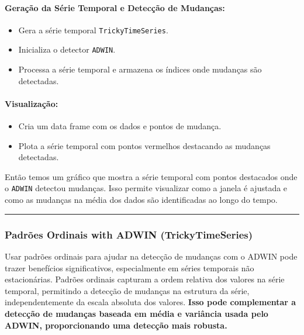 \documentclass[
]{article}
\providecommand{\tightlist}{%
  \setlength{\itemsep}{0pt}\setlength{\parskip}{0pt}}
\begin{document}
\hypertarget{gerauxe7uxe3o-da-suxe9rie-temporal-e-detecuxe7uxe3o-de-mudanuxe7as}{%
\paragraph{Geração da Série Temporal e Detecção de
Mudanças:}\label{gerauxe7uxe3o-da-suxe9rie-temporal-e-detecuxe7uxe3o-de-mudanuxe7as}}

\begin{itemize}
\tightlist
\item
  Gera a série temporal \texttt{TrickyTimeSeries}.
\item
  Inicializa o detector \texttt{ADWIN}.
\item
  Processa a série temporal e armazena os índices onde mudanças são
  detectadas.
\end{itemize}

\hypertarget{visualizauxe7uxe3o}{%
\paragraph{Visualização:}\label{visualizauxe7uxe3o}}

\begin{itemize}
\tightlist
\item
  Cria um data frame com os dados e pontos de mudança.
\item
  Plota a série temporal com pontos vermelhos destacando as mudanças
  detectadas.
\end{itemize}

Então temos um gráfico que mostra a série temporal com pontos destacados
onde o \texttt{ADWIN} detectou mudanças. Isso permite visualizar como a
janela é ajustada e como as mudanças na média dos dados são
identificadas ao longo do tempo.

\begin{center}\rule{0.5\linewidth}{0.5pt}\end{center}

\hypertarget{padruxf5es-ordinais-with-adwin-trickytimeseries}{%
\subsubsection{Padrões Ordinais with ADWIN
(TrickyTimeSeries)}\label{padruxf5es-ordinais-with-adwin-trickytimeseries}}

Usar padrões ordinais para ajudar na detecção de mudanças com o ADWIN
pode trazer benefícios significativos, especialmente em séries temporais
não estacionárias. Padrões ordinais capturam a ordem relativa dos
valores na série temporal, permitindo a detecção de mudanças na
estrutura da série, independentemente da escala absoluta dos valores.
\textbf{Isso pode complementar a detecção de mudanças baseada em média e
variância usada pelo ADWIN, proporcionando uma detecção mais robusta.}
\end{document}
